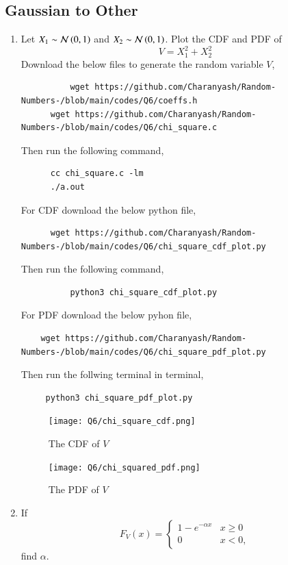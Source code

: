 \documentclass[journal,12pt,twocolumn]{IEEEtran}
\renewcommand\thesection{\arabic{section}}
\begin{document}
\begin{enumerate}[label=\thesection.\arabic*,ref=\thesection.\theenumi]
\section{Gaussian to Other}
\begin{enumerate}[label=\thesection.\arabic*
,ref=\thesection.\theenumi]
\item
Let $X_1 \sim  \mathcal{N}\left(0,1\right)$ and $X_2 \sim  \mathcal{N}\left(0,1\right)$. Plot the CDF and PDF of
%
\begin{equation}
V = X_1^2 + X_2^2
\end{equation}
 \solution Download the below files to generate the random variable $V$,
	 \begin{lstlisting}
          wget https://github.com/Charanyash/Random-Numbers-/blob/main/codes/Q6/coeffs.h
	  wget https://github.com/Charanyash/Random-Numbers-/blob/main/codes/Q6/chi_square.c
         \end{lstlisting}
	Then run the following command,
	 \begin{lstlisting}
	  cc chi_square.c -lm
	  ./a.out
	 \end{lstlisting}
	 For CDF download the below python file,
	 \begin{lstlisting}
	  wget https://github.com/Charanyash/Random-Numbers-/blob/main/codes/Q6/chi_square_cdf_plot.py
	 \end{lstlisting}
	 Then run the following command,
	\begin{lstlisting}
          python3 chi_square_cdf_plot.py
        \end{lstlisting}
       For PDF download the below pyhon file,
	\begin{lstlisting}
	wget https://github.com/Charanyash/Random-Numbers-/blob/main/codes/Q6/chi_square_pdf_plot.py
        \end{lstlisting}
       Then run the follwing terminal in terminal,
	\begin{lstlisting}
	 python3 chi_square_pdf_plot.py
	\end{lstlisting}
    \begin{figure}
     \centering
     \texttt{[image: Q6/chi\_square\_cdf.png]}
     \caption{The CDF of $V$}
     \label{fig:V_Cdf}
    \end{figure}
     \begin{figure}
     \centering
     \texttt{[image: Q6/chi\_squared\_pdf.png]}
     \caption{The PDF of $V$}
     \label{fig:V_PDF}
    \end{figure}
%
%
%
\item
If
%
\begin{equation}
F_{V}(x) =
\begin{cases}
1 - e^{-\alpha x} & x \geq 0 \\
0 & x < 0,
\end{cases}
\end{equation}
%
find $\alpha$.\\


\end{enumerate}
\end{enumerate}
\end{document}
